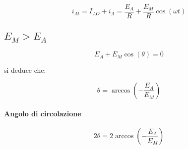 \begin{equation}
  i_{At} = I_{AO} + i_{A} = \frac{E_{A}}{R} + \frac{E_{M}}{R} \cos(\omega t)
\end{equation}

\subsection{$E_{M} > E_{A}$}

\begin{equation}
  E_{A} + E_{M} \cos(\theta) = 0
\end{equation}

si deduce che:

\begin{equation}
  \theta = \arccos(-\frac{E_{A}}{E_{M}})
\end{equation}

\paragraph{Angolo di circolazione}

\begin{equation}
  2 \theta = 2 \arccos(-\frac{E_{A}}{E_{M}})
\end{equation}
